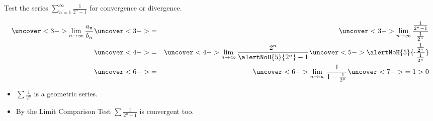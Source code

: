 \begin{frame}
\begin{example}
Test the series $\sum_{n=1}^\infty \frac{1}{2^n-1}$ for convergence or divergence.

%
\abovedisplayskip=0pt
\belowdisplayskip=0pt
\begin{eqnarray*}
\uncover<3->{%
\lim_{n\to\infty} \frac{a_n}{b_n}%
}%
& \uncover<3->{ = } &%
\uncover<3->{%
\lim_{n\to\infty} \frac{\frac{1}{2^n-1}}{\frac{1}{2^n}}%
}\\%
& \uncover<4->{ = } &%
\uncover<4->{%
\lim_{n\to\infty} \frac{2^n}{\alertNoH{ 5}{2^n}-1}\uncover<5->{\alertNoH{ 5}{\cdot \frac{\frac{1}{2^n}}{\frac{1}{2^n}}}}%
}\\%
& \uncover<6->{ = } &%
\uncover<6->{%
\lim_{n\to\infty} \frac{1}{1-\frac{1}{2^n}}%
}%
\uncover<7->{%
 = 1 > 0%
}%
\end{eqnarray*}
\begin{itemize}
\item<8-| alert@8-9>  $\sum \frac{1}{2^n}$ is a  geometric series.
\item<10->  By the Limit Comparison Test $\sum \frac{1}{2^n-1}$ is convergent too.%
\end{itemize}
\end{example}
\end{frame}
